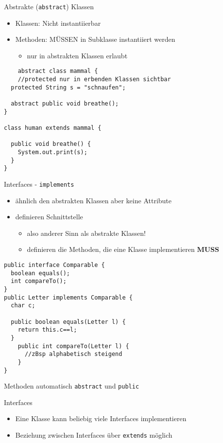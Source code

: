 \documentclass[18pt]{beamer}
\begin{document}
\begin{frame}[fragile]{Abstrakte (\lstinline{abstract}) Klassen}
\begin{itemize}
	\item Klassen: Nicht instantiierbar
	\item Methoden: MÜSSEN in Subklasse instantiiert werden
	\begin{itemize}
		\item nur in abstrakten Klassen erlaubt \pause
	\end{itemize}
\end{itemize}
\begin{lstlisting}
	abstract class mammal {
	//protected nur in erbenden Klassen sichtbar
  protected String s = "schnaufen";

  abstract public void breathe();
}

class human extends mammal {

  public void breathe() {
    System.out.print(s);
  }
}
\end{lstlisting}
\end{frame}

\begin{frame}[fragile]{Interfaces - \lstinline{implements}}
\begin{itemize}
	\item ähnlich den abstrakten Klassen aber keine Attribute \pause
	\item definieren Schnittstelle  
	\begin{itemize}
		\item also anderer Sinn als abstrakte Klassen!  \pause
		\item definieren die Methoden, die eine Klasse implementieren \textbf{MUSS}
	\end{itemize}
\end{itemize}
\begin{lstlisting}[mathescape]
public interface Comparable {
  boolean equals();
  int compareTo();
}
public Letter implements Comparable {
  char c;
	
  public boolean equals(Letter l) {
    return this.c==l;
  } 
	public int compareTo(Letter l) {
	  //zBsp alphabetisch steigend
	}
}
\end{lstlisting} \pause
Methoden automatisch \lstinline{abstract} und \lstinline{public}
\end{frame}

\begin{frame}[fragile]{Interfaces}
\begin{itemize}
	\item Eine Klasse kann beliebig viele Interfaces implementieren \pause
	\item Beziehung zwischen Interfaces über \lstinline{extends} möglich \pause
\end{itemize}
\end{frame}
\end{document}

